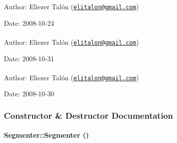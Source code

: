 \begin{Desc}
\item[Author:]Eliezer Talón (\href{mailto:elitalon@gmail.com}{\tt elitalon@gmail.com}) \end{Desc}
\begin{Desc}
\item[Date:]2008-10-24 \end{Desc}
\hypertarget{class_segmenter_b3190459e52101e495e49e936bbb6440}{
\paragraph[LineMarkerIterator]{}\hfill}
\label{class_segmenter_b3190459e52101e495e49e936bbb6440}


\begin{Desc}
\item[Author:]Eliezer Talón (\href{mailto:elitalon@gmail.com}{\tt elitalon@gmail.com}) \end{Desc}
\begin{Desc}
\item[Date:]2008-10-31 \end{Desc}
\hypertarget{class_segmenter_1190be7ec081a96ee2ae91e0bb256a0d}{
\paragraph[ShapeIterator]{}\hfill}
\label{class_segmenter_1190be7ec081a96ee2ae91e0bb256a0d}


\begin{Desc}
\item[Author:]Eliezer Talón (\href{mailto:elitalon@gmail.com}{\tt elitalon@gmail.com}) \end{Desc}
\begin{Desc}
\item[Date:]2008-10-30 \end{Desc}


\subsubsection{Constructor \& Destructor Documentation}
\hypertarget{class_segmenter_d39ec3bda31be180820aa0bdca7b125d}{
\paragraph[Segmenter]{\setlength{\rightskip}{0pt plus 5cm}Segmenter::Segmenter ()}\hfill}
\label{class_segmenter_d39ec3bda31be180820aa0bdca7b125d}


